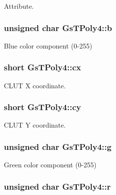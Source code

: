 Attribute. 

\hypertarget{structGsTPoly4_ab63bd47c343b40ec9a63e0d4a726cecc}{}
\subsubsection[{b}]{\setlength{\rightskip}{0pt plus 5cm}unsigned char Gs\+T\+Poly4\+::b}\label{structGsTPoly4_ab63bd47c343b40ec9a63e0d4a726cecc}


Blue color component (0-\/255) 

\hypertarget{structGsTPoly4_a594a5d5e85f45941aac5187ff2dde2d2}{}
\subsubsection[{cx}]{\setlength{\rightskip}{0pt plus 5cm}short Gs\+T\+Poly4\+::cx}\label{structGsTPoly4_a594a5d5e85f45941aac5187ff2dde2d2}


C\+L\+U\+T X coordinate. 

\hypertarget{structGsTPoly4_adb8d1f6369413b8c9d5393b36da40da8}{}
\subsubsection[{cy}]{\setlength{\rightskip}{0pt plus 5cm}short Gs\+T\+Poly4\+::cy}\label{structGsTPoly4_adb8d1f6369413b8c9d5393b36da40da8}


C\+L\+U\+T Y coordinate. 

\hypertarget{structGsTPoly4_a4fe23fe98949d3fc80cc851cf32f0f4e}{}
\subsubsection[{g}]{\setlength{\rightskip}{0pt plus 5cm}unsigned char Gs\+T\+Poly4\+::g}\label{structGsTPoly4_a4fe23fe98949d3fc80cc851cf32f0f4e}


Green color component (0-\/255) 

\hypertarget{structGsTPoly4_a0fc04cf3a1c90b8e4b672908ba6cbd24}{}
\subsubsection[{r}]{\setlength{\rightskip}{0pt plus 5cm}unsigned char Gs\+T\+Poly4\+::r}\label{structGsTPoly4_a0fc04cf3a1c90b8e4b672908ba6cbd24}


